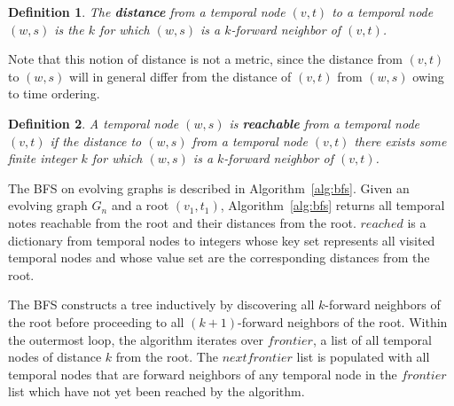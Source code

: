 \documentclass[10pt,conference,compsocconf]{IEEEtran}
\newtheorem{defn}{Definition}
\theoremstyle{definition}
\begin{document}
\begin{defn}
The \textbf{distance} from a temporal node $(v, t)$ to a temporal node $(w, s)$ is
the $k$ for which $(w, s)$ is a $k$-forward neighbor of $(v, t)$.
\end{defn}

Note that this notion of distance is not a metric, since the distance from $(v, t)$
to $(w, s)$ will in general differ from the distance of $(v, t)$ from $(w, s)$
owing to time ordering.


\begin{defn}
A temporal node $(w, s)$ is \textbf{reachable} from a temporal node $(v, t)$ if
the distance to $(w, s)$ from a temporal node $(v, t)$ there exists some finite
integer $k$ for which $(w, s)$ is a $k$-forward neighbor of $(v, t)$.
\end{defn}


The BFS on evolving graphs is described in Algorithm~\ref{alg:bfs}.
Given an evolving graph $G_n$ and a root $(v_1, t_1)$,
Algorithm~\ref{alg:bfs} returns all temporal notes reachable from the root and
their distances from the root.
$reached$ is a dictionary from temporal nodes to integers whose key set represents
all visited temporal nodes and whose value set are the corresponding distances
from the root.

The BFS constructs a tree inductively by discovering all $k$-forward neighbors
of the root before proceeding to all $(k+1)$-forward neighbors of the root.
Within the outermost loop, the algorithm iterates over $frontier$, a list of all
temporal nodes of distance $k$ from the root. The $nextfrontier$ list is populated
with all temporal nodes that are forward neighbors of any temporal node in the
$frontier$ list which have not yet been reached by the algorithm.
\end{document}
